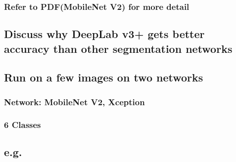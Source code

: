 \documentclass{article}
\begin{document}
\subsubsection{Refer to PDF(MobileNet V2) for more detail}
\subsection{Discuss why DeepLab v3+ gets better accuracy than other segmentation networks}
\subsection{Run on a few images on two networks}
\subsubsection{Network: MobileNet V2, Xception}
\subsubsection{6 Classes}
\subsection{e.g.}
\end{document}
